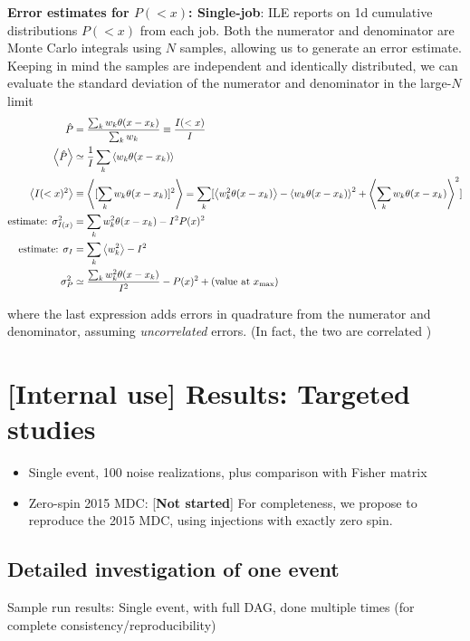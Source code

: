 \begin{widetext}
\noindent \textbf{Error estimates for $P(<x)$: Single-job}:  ILE reports on 1d cumulative distributions $P(<x)$ from
each job.  Both the numerator and denominator are Monte Carlo integrals using $N$ samples, allowing us to generate an
error estimate.  Keeping in mind the samples are independent and identically distributed, we can evaluate the standard
deviation of the numerator and denominator in the large-$N$ limit
\begin{align}
\hat{P} &= \frac{\sum_k w_k \theta(x-x_k)}{\sum_k w_k} \equiv \frac{ I(<x)}{I} \\
\left< \hat{P} \right> &\simeq \frac{1}{I} \sum_k \left<w_k \theta(x-x_k) \right>  \\
\left<I(<x)^2\right>& \equiv \left<[\sum_k w_k \theta(x-x_k)]^2\right> 
  = \sum_k[ \left<w_k^2 \theta(x-x_k)\right>  -\left<w_k\theta(x-x_k)\right>^2
  + \left<\sum_{k} w_k \theta(x-x_k)\right>^2]  \\
\text{estimate: }\sigma_{I(x)}^2 &= \sum_k w_k^2 \theta(x-x_k)  - I^2 P(x)^2 \\
\text{estimate: } \sigma_{I} &= \sum_k \left<w_k^2\right> - I^2 \\
\sigma_P^2 & \simeq \frac{\sum_k w_k^2 \theta(x-x_k)}{I^2} - P(x)^2 + (\text{value at } x_{\rm max})
\end{align}
\end{widetext}
where the last expression adds errors in quadrature from the numerator and denominator, assuming \emph{uncorrelated}
errors.    (In fact, the two are correlated )



\section{[Internal use] Results: Targeted studies}

\begin{itemize}
\item Single event, 100 noise realizations, plus comparison with Fisher matrix

\item Zero-spin 2015 MDC: [\textbf{Not started}]  For completeness, we propose to reproduce the 2015 MDC,  using
  injections with exactly zero spin.

\end{itemize}

\subsection{Detailed investigation of one event}
Sample run results: Single event, with full DAG, done multiple times (for complete consistency/reproducibility)

